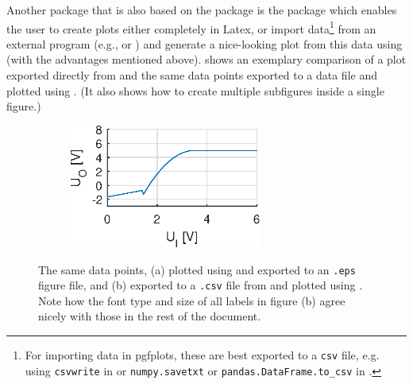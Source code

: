 Another package that is also based on the  package is the \pgfplots{} package which enables the user to create plots either completely in Latex, or import data\footnote{For importing data in pgfplots, these are best exported to a \texttt{csv} file, e.g. using \texttt{csvwrite} in \matlab{} or \texttt{numpy.savetxt} or \texttt{pandas.DataFrame.to\_csv} in \python{}.} from an external program (e.g., \matlab{} or \python{}) and generate a nice-looking plot from this data using  (with the advantages mentioned above).
 shows an exemplary comparison of a plot exported directly from \matlab{} and the same data points exported to a data file and plotted using \pgfplots{}.
(It also shows how to create multiple subfigures inside a single figure.)
\begin{figure}[htbp]
	\centering
	\begin{subfigure}[t]{.5\textwidth}
		\centering
		\includegraphics[width=2.5in]{figures/generated/ex2.eps}
		\caption{}
	\end{subfigure}%
	\begin{subfigure}[t]{.5\textwidth}
		\caption{}
	\end{subfigure}
	\caption{The same data points, (a) plotted using \matlab{} and exported to an \texttt{.eps} figure file, and (b) exported to a \texttt{.csv} file from \matlab{} and plotted using \pgfplots{}.
	Note how the font type and size of all labels in figure (b) agree nicely with those in the rest of the document.}
	\label{fig:matlab}
\end{figure}
